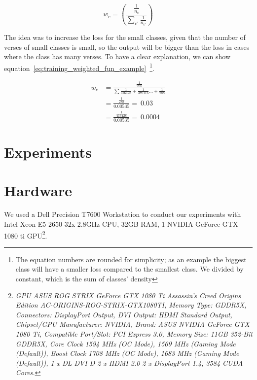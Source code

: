 \begin{equation}\label{eq:training_weighted_fun}
 w_c = \left(\frac{\frac{1}{n_c}}{\sum_{c'} \frac{1}{n_{c'}}} \right)
\end{equation}

The idea was to increase the loss for the small classes, given that the number of verses of small classes is small, so the output will be bigger than the loss in cases where the class has many verses. To have a clear explanation, we can show equation~\ref{eq:training_weighted_fun_example}~\footnote{The equation numbers are rounded for simplicity; as an example the biggest class will have a smaller loss compared to the smallest class. We divided by constant, which is the sum of classes’ density}.

\begin{subequations}
 \begin{align}
 w_c &= \frac{\frac{1}{288}}{\sum\frac{1}{416428}+\frac{1}{370116}\dots+\frac{1}{288}}\\
  &= \frac{\frac{1}{288}}{0.00535} = ~0.03 \\
  &= \frac{\frac{1}{416428}}{0.00535} = ~0.0004
 \end{align}\label{eq:training_weighted_fun_example}
\end{subequations}

\clearpage

\section{Experiments}

\section{Hardware}

We used a Dell Precision T7600 Workstation to conduct our experiments with Intel Xeon E5-2650 32x 2.8GHz CPU, 32GB RAM, 1 NVIDIA GeForce GTX 1080 ti GPU\footnote{\textit{GPU ASUS ROG STRIX GeForce GTX 1080 Ti Assassin's Creed Origins Edition AC-ORIGINS-ROG-STRIX-GTX1080TI, Memory Type: GDDR5X, Connectors: DisplayPort Output, DVI Output: HDMI Standard Output, Chipset/GPU Manufacturer: NVIDIA, Brand: ASUS NVIDIA GeForce GTX 1080 Ti, Compatible Port/Slot: PCI Express 3.0, Memory Size: 11GB 352-Bit GDDR5X, Core Clock 1594 MHz (OC Mode), 1569 MHz (Gaming Mode (Default)), Boost Clock 1708 MHz (OC Mode), 1683 MHz (Gaming Mode (Default)), 1 x DL-DVI-D 2 x HDMI 2.0 2 x DisplayPort 1.4, 3584 CUDA Cores.}}.

